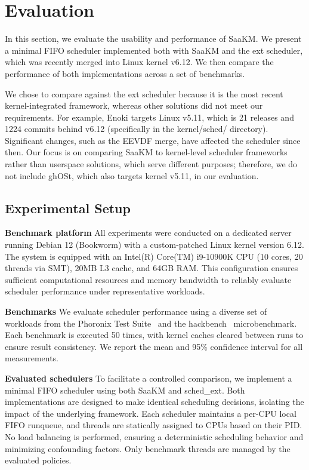 
\section{Evaluation}

In this section, we evaluate the usability and performance of SaaKM. We present a minimal FIFO scheduler implemented both with SaaKM and the ext scheduler\cite{schedext}, which was recently merged into Linux kernel v6.12. We then compare the performance of both implementations across a set of benchmarks.

We chose to compare against the ext scheduler because it is the most recent kernel-integrated framework, whereas other solutions did not meet our requirements. For example, Enoki\cite{enoki} targets Linux v5.11, which is 21 releases and 1224 commits behind v6.12 (specifically in the kernel/sched/ directory). Significant changes, such as the EEVDF merge, have affected the scheduler since then. Our focus is on comparing SaaKM to kernel-level scheduler frameworks rather than userspace solutions, which serve different purposes; therefore, we do not include ghOSt, which also targets kernel v5.11, in our evaluation.

\subsection{Experimental Setup}
\textbf{Benchmark platform} All experiments were conducted on a dedicated server running Debian 12 (Bookworm) with a custom-patched Linux kernel version 6.12. The system is equipped with an Intel(R) Core(TM) i9-10900K CPU (10 cores, 20 threads via SMT), 20MB L3 cache, and 64GB RAM. This configuration ensures sufficient computational resources and memory bandwidth to reliably evaluate scheduler performance under representative workloads. 

\parspace
\textbf{Benchmarks} We evaluate scheduler performance using a diverse set of workloads from the Phoronix Test Suite~\cite{phoronix} and the hackbench~\cite{hackbench} microbenchmark. Each benchmark is executed 50 times, with kernel caches cleared between runs to ensure result consistency. We report the mean and 95\% confidence interval for all measurements. 

\parspace
\textbf{Evaluated schedulers} To facilitate a controlled comparison, we implement a minimal FIFO scheduler using both SaaKM and sched\_ext. Both implementations are designed to make identical scheduling decisions, isolating the impact of the underlying framework. Each scheduler maintains a per-CPU local FIFO runqueue, and threads are statically assigned to CPUs based on their PID. No load balancing is performed, ensuring a deterministic scheduling behavior and minimizing confounding factors. Only benchmark threads are managed by the evaluated policies.


